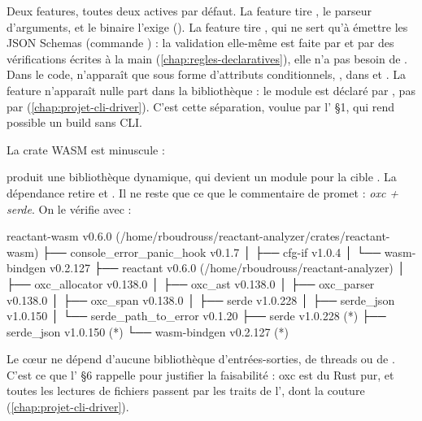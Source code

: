 Deux features, toutes deux actives par défaut. La feature  tire , le parseur d'arguments, et le binaire  l'exige (). La feature  tire , qui ne sert qu'à émettre les JSON Schemas (commande ) : la validation elle-même est faite par  et par des vérifications écrites à la main (\cref{chap:regles-declaratives}), elle n'a pas besoin de . Dans le code,  n'apparaît que sous forme d'attributs conditionnels, \code{\#[cfg_attr(feature = "schema-gen", derive(JsonSchema))]}, dans  et . La feature  n'apparaît nulle part dans la bibliothèque : le module  est déclaré par , pas par  (\cref{chap:projet-cli-driver}). C'est cette séparation, voulue par l' §1, qui rend possible un build sans CLI.

La crate WASM est minuscule :


 produit une bibliothèque dynamique, qui devient un module  pour la cible . La dépendance  retire  et . Il ne reste que ce que le commentaire de  promet : \og \emph{oxc + serde}\fg{}. On le vérifie avec  :

\begin{sortie}
reactant-wasm v0.6.0 (/home/rboudrouss/reactant-analyzer/crates/reactant-wasm)
├── console_error_panic_hook v0.1.7
│   ├── cfg-if v1.0.4
│   └── wasm-bindgen v0.2.127
├── reactant v0.6.0 (/home/rboudrouss/reactant-analyzer)
│   ├── oxc_allocator v0.138.0
│   ├── oxc_ast v0.138.0
│   ├── oxc_parser v0.138.0
│   ├── oxc_span v0.138.0
│   ├── serde v1.0.228
│   ├── serde_json v1.0.150
│   └── serde_path_to_error v0.1.20
├── serde v1.0.228 (*)
├── serde_json v1.0.150 (*)
└── wasm-bindgen v0.2.127 (*)
\end{sortie}

Le cœur ne dépend d'aucune bibliothèque d'entrées-sorties, de threads ou de . C'est ce que l' §6 rappelle pour justifier la faisabilité : oxc est du Rust pur, et toutes les lectures de fichiers passent par les traits de l', dont la couture  (\cref{chap:projet-cli-driver}).

